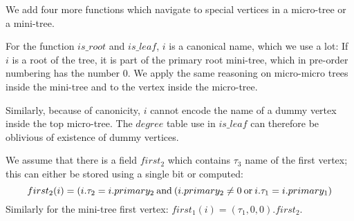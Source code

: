 We add four more functions which navigate to special vertices in a micro-tree or a mini-tree.

\begin{algorithmic}
	\State {}
\EndFunction
\end{algorithmic}

\begin{algorithmic}
	\State {}
\EndFunction
\end{algorithmic}

\begin{algorithmic}
 
	\State {}
\EndFunction
\end{algorithmic}

\begin{algorithmic}
 
	\State {}
\EndFunction
\end{algorithmic}

For the function $is\_root$ and $is\_leaf$, $i$ is a canonical name, which we use a lot:
If $i$ is a root of the tree, it is part of the primary root mini-tree, which in pre-order numbering has the number $0$.
We apply the same reasoning on micro-micro trees inside the mini-tree and to the vertex inside the micro-tree.

Similarly, because of canonicity, $i$ cannot encode the name of a dummy vertex inside the top micro-tree.
The $degree$ table use in $is\_leaf$ can therefore be oblivious of existence of dummy vertices.

\begin{algorithmic}
	\State {}
\EndFunction
\end{algorithmic}

\begin{algorithmic}
	\State {}
\EndFunction
\end{algorithmic}

We assume that there is a field $first_2$ which contains $\tau_3$ name of the first vertex; this can either be stored using a single bit or computed:
$$first_2(i) = (i.\tau_2 = i.primary_2 \mathbin{\textrm{and}} (i.primary_2 \ne 0 \mathbin{\textrm{or}} i.\tau_1 = i.primary_1)$$
Similarly for the mini-tree first vertex: $first_1(i) = (\tau_1, 0, 0).first_2$.

